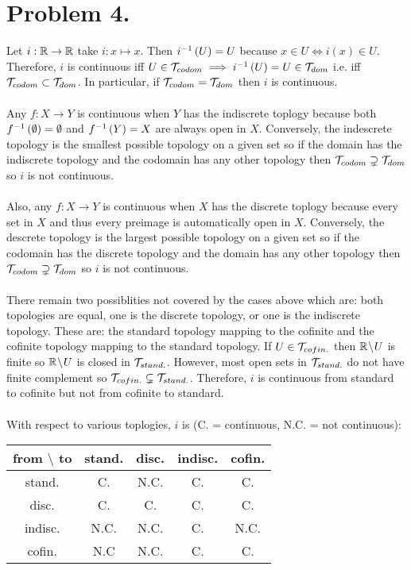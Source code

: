 \documentclass[12pt]{extarticle}
\begin{document}
\section*{Problem 4.} 
Let $i : \mathbb{R} \rightarrow \mathbb{R}$ take $i : x \mapsto x$. Then $i^{-1} \left( U \right) = U$ because $x \in U \iff i(x) \in U$. Therefore, $i$ is continuous iff $U \in \mathcal{T}_{codom} \implies i^{-1} \left( U \right) = U \in \mathcal{T}_{dom}$ i.e. iff $\mathcal{T}_{codom} \subset \mathcal{T}_{dom}$. In particular, if $\mathcal{T}_{codom} = \mathcal{T}_{dom}$ then $i$ is continuous. \\ \\
Any $f : X \rightarrow Y$ is continuous when $Y$ has the indiscrete toplogy because both $f^{-1} \left( \emptyset \right) = \emptyset$ and $f^{-1} \left( Y \right) = X$ are always open in $X$.
Conversely, the indescrete topology is the smallest possible topology on a given set so if the domain has the indiscrete topology and the codomain has any other topology then $\mathcal{T}_{codom} \supsetneq \mathcal{T}_{dom}$ so $i$ is not continuous. \\ \\ 
Also, any $f : X \rightarrow Y$ is continuous when $X$ has the discrete toplogy because every set in $X$ and thus every preimage is automatically open in $X$.
Conversely, the descrete topology is the largest possible topology on a given set so if the codomain has the discrete topology and the domain has any other topology then $\mathcal{T}_{codom} \supsetneq \mathcal{T}_{dom}$ so $i$ is not continuous. \\ \\ 
There remain two possiblities not covered by the cases above which are: both topologies are equal, one is the discrete topology, or one is the indiscrete topology. These are: the standard topology mapping to the cofinite and the cofinite topology mapping to the standard topology. If $U \in \mathcal{T}_{cofin.}$ then $\mathbb{R} \! \setminus \! U$ is finite so $\mathbb{R} \! \setminus \! U$ is closed in $\mathcal{T}_{stand.}$. However, most open sets in $\mathcal{T}_{stand.}$ do not have finite complement so $\mathcal{T}_{cofin.} \subsetneq \mathcal{T}_{stand.}$. Therefore, $i$ is continuous from standard to cofinite but not from cofinite to standard.   \\ \\
With respect to various toplogies, $i$ is (C. = continuous, N.C. = not continuous): 

\begin{center}
\begin{tabular}{ c | c c c c}
 from $\setminus$ to & stand. & disc. & indisc. & cofin. \\
\hline
 stand. & C. & N.C. & C. & C. \\ 
 disc. & C. & C. & C. & C. \\  
 indisc. & N.C. & N.C. & C. & N.C. \\
 cofin. & N.C & N.C. & C. & C. 
\end{tabular}
\end{center}
\end{document}
